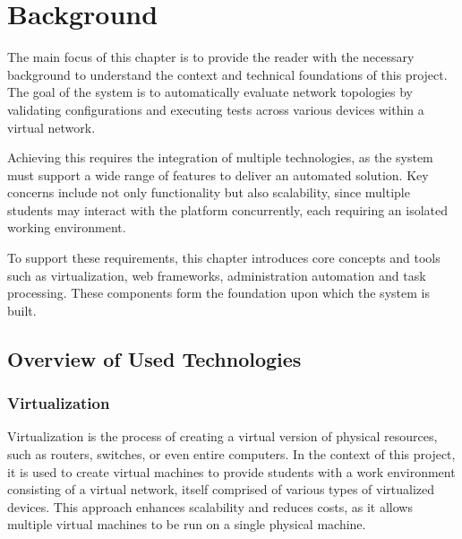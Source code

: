 
\chapter{Background}


\label{Chapter2Background}


The main focus of this chapter is to provide the reader with the necessary background to understand the context and technical 
foundations of this project. The goal of the system is to automatically evaluate network topologies by validating 
configurations and executing tests across various devices within a virtual network.

Achieving this requires the integration of multiple technologies, as the system must support a wide range of features to 
deliver an automated solution. Key concerns include not only functionality but also scalability, since 
multiple students may interact with the platform concurrently, each requiring an isolated working environment.

To support these requirements, this chapter introduces core concepts and tools such as virtualization, web frameworks, 
administration automation and task processing. These components form the foundation upon which the system is built.

\section{Overview of Used Technologies}

  \subsection{Virtualization}
    Virtualization is the process of creating a virtual version of physical resources, such as routers, switches, or even
    entire computers. In the context of this project, it is used to create virtual machines to provide students with a 
    work environment consisting of a virtual network, itself comprised of various types of virtualized devices. This approach 
    enhances scalability and reduces costs, as it allows multiple virtual machines to be run on a single physical machine.

